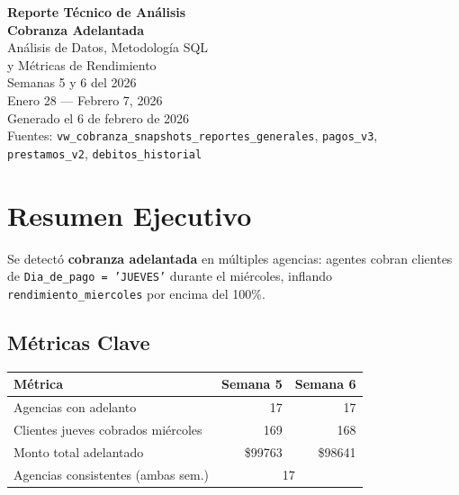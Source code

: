 \documentclass[11pt,a4paper]{article}
\newcommand{\money}[1]{\$\num{#1}}
\begin{document}
\thispagestyle{empty}
\vspace*{3cm}
\begin{center}
  {\Huge\bfseries\color{xpressblue} Reporte T\'ecnico de An\'alisis}\\[0.5cm]
  {\Huge\bfseries\color{xpressblue} Cobranza Adelantada}\\[1.5cm]
  {\Large\color{xpressgray} An\'alisis de Datos, Metodolog\'ia SQL\\y M\'etricas de Rendimiento}\\[2.5cm]
  {\large Semanas 5 y 6 del 2026}\\[0.3cm]
  {\large Enero 28 --- Febrero 7, 2026}\\[3cm]
  {\normalsize\color{xpressgray} Generado el 6 de febrero de 2026}\\[0.3cm]
  {\normalsize\color{xpressgray} Fuentes: \texttt{vw\_cobranza\_snapshots\_reportes\_generales},
  \texttt{pagos\_v3}, \texttt{prestamos\_v2}, \texttt{debitos\_historial}}
\end{center}
\newpage

\tableofcontents
\newpage

\section{Resumen Ejecutivo}

Se detect\'o \textbf{cobranza adelantada} en m\'ultiples agencias: agentes cobran
clientes de \texttt{Dia\_de\_pago = 'JUEVES'} durante el mi\'ercoles, inflando
\texttt{rendimiento\_miercoles} por encima del 100\%.

\subsection{M\'etricas Clave}

\begin{center}
\renewcommand{\arraystretch}{1.4}
\begin{tabular}{lrr}
\toprule
\textbf{M\'etrica} & \textbf{Semana 5} & \textbf{Semana 6} \\
\midrule
Agencias con adelanto & 17 & 17 \\
Clientes jueves cobrados mi\'ercoles & 169 & 168 \\
Monto total adelantado & \money{99763} & \money{98641} \\
Agencias consistentes (ambas sem.) & \multicolumn{2}{c}{17} \\

\bottomrule
\end{tabular}
\end{center}
\end{document}
